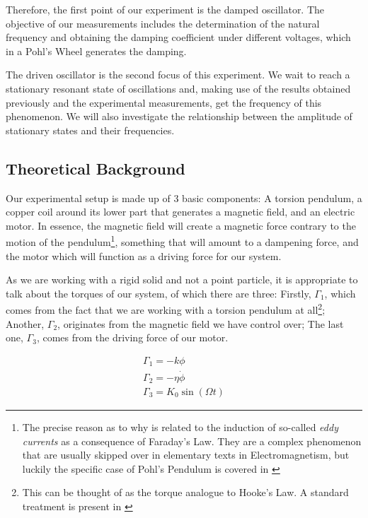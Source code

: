 \documentclass[a4paper,12pt]{article}
\begin{document}
Therefore, the first point of our experiment is the damped oscillator. The objective of our measurements includes the determination of the natural frequency and obtaining the damping coefficient under different voltages, which in a Pohl’s Wheel generates the damping. 

The driven oscillator is the second focus of this experiment. We wait to reach a stationary resonant state of oscillations and, making use of the results obtained previously and the experimental measurements, get the frequency of this phenomenon. We will also investigate the relationship between the amplitude of stationary states and their frequencies. 


\subsection{Theoretical Background}
Our experimental setup is made up of 3 basic components: A torsion pendulum, a copper coil around its lower part that generates a magnetic field, and an electric motor. In essence, the magnetic field will create a magnetic force contrary to the motion of the pendulum\footnote{The precise reason as to why is related to the induction of so-called \textit{eddy currents} as a consequence of Faraday's Law. They are a complex phenomenon that are usually skipped over in elementary texts in Electromagnetism, but luckily the specific case of Pohl's Pendulum is covered in \cite[486]{Zangwill} }, something that will amount to a dampening force, and the motor which will function as a driving force for our system.

As we are working with a rigid solid and not a point particle, it is appropriate to talk about the torques of our system, of which there are three: Firstly, $\Gamma_1$, which comes from the fact that we are working with a torsion pendulum at all\footnote{This can be thought of as the torque analogue to Hooke's Law. A standard treatment is present in \cite[434]{University}}; Another, $\Gamma_2$, originates from the magnetic field we have control over; The last one, $\Gamma_3$, comes from the driving force of our motor.


  \begin{equation}
  \label{momentos}
  \begin{gathered}
   \Gamma_1 = -k\phi \\
    \Gamma_2 = -\eta \dot{\phi} \\
    \Gamma_3 = K_0 \sin(\Omega t)
  \end{gathered}
\end{equation}
\end{document}
